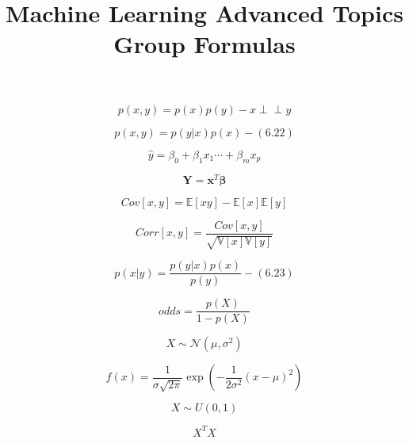 \documentclass[11pt,landscape]{article}
\date{} %
\title{Machine Learning Advanced Topics Group Formulas \vspace{-4em}}
\newcommand{\indep}{\perp \!\!\! \perp}
\begin{document}
\maketitle

\begin{multicols}{2}

\begin{equation}
	p(x,y) = p(x)p(y) -  x \indep y
\end{equation}

\begin{equation}
	p(x,y) = p(y|x)p(x) - (6.22)
\end{equation}

\begin{equation}
	\hat{y} = \beta_0 + \beta_1 x_1 \cdots + \beta_m x_p
\end{equation}

\begin{equation}
	\boldsymbol{Y} = \boldsymbol{x}^T \boldsymbol{\beta}
\end{equation}

\begin{equation}
Cov[x,y] = \mathbb{E}[xy]-\mathbb{E}[x]\mathbb{E}[y]
\end{equation}

\begin{equation}
Corr[x,y] = \frac{Cov[x,y]}{\sqrt{\mathbb{V}[x] \mathbb{V}[y]}}
\end{equation}

\begin{equation}
	p(x|y) = \frac{p(y|x)p(x)}{p(y)} - (6.23)
\end{equation}


\begin{equation}
odds = \frac{p(X)}{1-p(X)}
\end{equation}

\begin{equation}
X\sim \mathcal{N}(\mu,\sigma^2)
\end{equation}

\begin{equation}
	f(x) = \frac{1}{\sigma\sqrt{2\pi}}\exp(-\frac{1}{2\sigma^2}(x-\mu)^2) %
\end{equation}


\begin{equation}
	X \sim U(0, 1)
\end{equation}

\begin{equation}
	X^TX
\end{equation}


\end{multicols}
\end{document}
